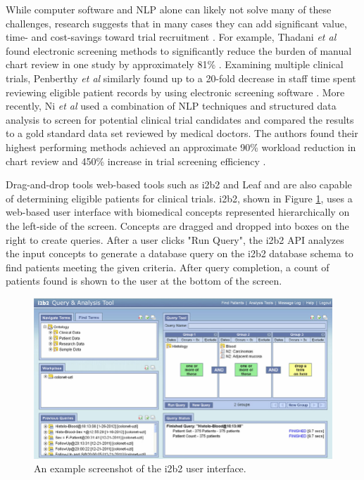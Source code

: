 \documentclass[../main.tex]{subfiles}
\begin{document}
While computer software and NLP alone can likely not solve many of these challenges, research suggests that in many cases they can add significant value, time- and cost-savings toward trial recruitment \cite{penberthy2010automated, thadani2009electronic}. For example, Thadani \textit{et al} found electronic screening methods to significantly reduce the burden of manual chart review in one study by approximately 81\% \cite{thadani2009electronic}. Examining multiple clinical trials, Penberthy \textit{et al} similarly found up to a 20-fold decrease in staff time spent reviewing eligible patient records by using electronic screening software \cite{penberthy2010automated}. More recently, Ni \textit{et al} used a combination of NLP techniques and structured data analysis to screen for potential clinical trial candidates and compared the results to a gold standard data set reviewed by medical doctors. The authors found their highest performing methods achieved an approximate 90\% workload reduction in chart review and 450\% increase in trial screening efficiency \cite{ni2015automated}. 

Drag-and-drop tools web-based tools such as i2b2 \cite{murphy2010serving} and Leaf \cite{dobbins2019leaf} and are also capable of determining eligible patients for clinical trials. i2b2, shown in Figure \ref{fig_i2b2}, uses a web-based user interface with biomedical concepts represented hierarchically on the left-side of the screen. Concepts are dragged and dropped into boxes on the right to create queries. After a user clicks "Run Query", the i2b2 API analyzes the input concepts to generate a database query on the i2b2 database schema to find patients meeting the given criteria. After query completion, a count of patients found is shown to the user at the bottom of the screen. 

\begin{figure}[h!]
  \includegraphics[scale=0.55]{Figures/2_background/i2b2.png}  
\caption{An example screenshot of the i2b2 user interface.}
\label{fig_i2b2}
\end{figure}
\end{document}
